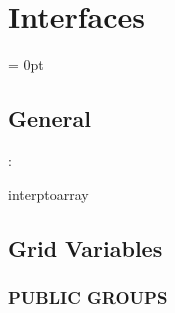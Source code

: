 
\section{Interfaces} 


\parskip = 0pt

\vspace{3mm} \subsection*{General}

: 

interptoarray
\vspace{2mm}
\subsection*{Grid Variables}
\vspace{5mm}\subsubsection{PUBLIC GROUPS}

\vspace{5mm}

